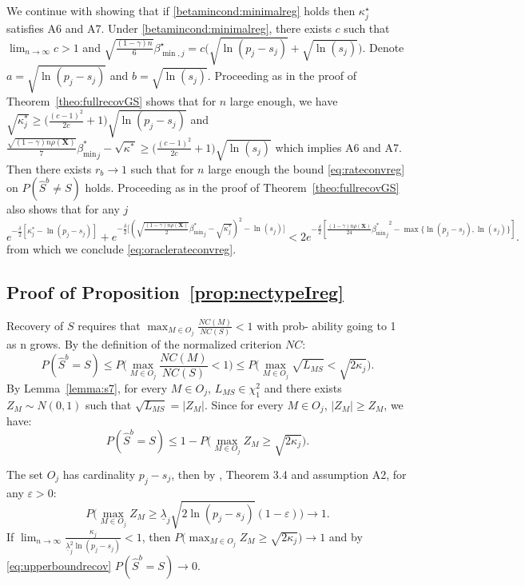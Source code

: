 \documentclass[aos]{imsart}
\theoremstyle{plain}
\newcommand{\bs}{\boldsymbol}
\begin{document}
We continue with showing that if \eqref{betamincond:minimalreg} holds then $\kappa^\star_j$ satisfies A6 and A7. Under \eqref{betamincond:minimalreg}, there exists $c$ such that $\lim_{n\to\infty} c>1$ and $\sqrt{\frac{(1-\gamma)n}{6}}\beta^\star_{\min,j}=c\big(\sqrt{\ln(p_j-s_j)} + \sqrt{\ln(s_j)}\big)$. Denote $a=\sqrt{\ln(p_j-s_j)}$ and $b=\sqrt{\ln(s_j)}$. Proceeding as in the proof of Theorem~\ref{theo:fullrecovGS} shows that for $n$ large enough, we have $\sqrt{\kappa^*_j} \geq  \big(\frac{(c-1)^2}{2c}+1\big)\sqrt{\ln(p_j-s_j)}$ and $\frac{\sqrt{(1-\gamma) n\rho(\bs X)}}{7}{{\beta_{\min}^*}_j}-\sqrt{\kappa^*} \geq \big(\frac{(c-1)^2}{2c}+1\big)\sqrt{\ln(s_j)}$
    which implies A6 and A7.
Then there exists $r_b\to 1$ such that for $n$ large enough the bound \eqref{eq:rateconvreg} on $P(\hat S^b \neq S)$ holds. Proceeding as in the proof of Theorem~\ref{theo:fullrecovGS} also shows that for any $j$ 
    $$e^{-\frac{\delta}{2}\left[{\kappa^*_j}-\ln(p_j-s_j)\right]}+e^{-\frac{\delta}{2}\big[(\sqrt{\frac{(1-\gamma) n\rho(\bs X)}{2}}{{\beta_{\min}^*}_j} - \sqrt{\kappa_j^*})^2 -\ln(s_j) \big]} <2 e^{-\frac{\delta}{2}[\frac{(1-\gamma) n\rho(\bs X)}{24}{{\beta_{\min}^*}_j}^2-\max\{\ln(p_j-s_j),\ln(s_j)\}]}. $$
from which we conclude \eqref{eq:oraclerateconvreg}.

\subsection{Proof of Proposition~\ref{prop:nectypeIreg}}

Recovery of $S$ requires that $\max_{M\in O_j}\frac{NC(M)}{NC(S)}<1$ with prob-
ability going to 1 as n grows. By the definition of the normalized criterion $NC$:
$$P(\hat{S}^b=S) \leq P\Big(\max_{M\in O_j}\frac{NC(M)}{NC(S)}<1\Big)\leq  P\big(\max_{M\in O_j}\sqrt{L_{MS}}<\sqrt{2\kappa_j}\Big).$$
By Lemma~\ref{lemma:s7}, for every $M\in O_j$, $L_{MS}\in \chi^2_1$ and there exists $Z_M\sim N(0,1)$ such that $\sqrt{L_{MS}}=|Z_M|$. Since for every $M\in O_j$, $|Z_M|\geq Z_M$, we have:
\begin{equation}\label{eq:upperboundrecov}
    P(\hat{S}^b=S) \leq  1-P\big(\max_{M\in O_j}Z_M\geq\sqrt{2\kappa_j}\Big).
\end{equation}

The set $O_j$ has cardinality $p_j-s_j$, then by \cite{hartigan}, Theorem 3.4  and assumption A2, for any $\varepsilon>0$:
$$P\big(\max_{M\in O_j}Z_M \geq \underline{\lambda}_j \sqrt{2 \ln(p_j-s_j)}(1-\varepsilon)\big) \to 1.$$
If $\lim_{n\to\infty}\frac{\kappa_j}{\underline{\lambda}_j^2\ln(p_j-s_j)} <1$, then $P\big(\max_{M\in O_j}Z_M\geq\sqrt{2\kappa_j}\big) \to 1$ and by \eqref{eq:upperboundrecov} $P(\hat{S}^b=S) \to 0$.
\end{document}
